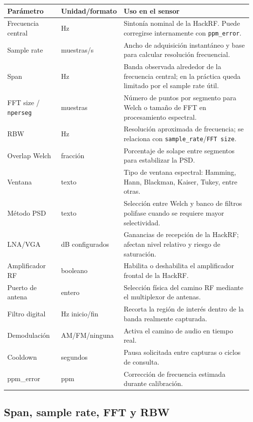 \begin{longtable}{p{}p{}p{}}
\toprule
\textbf{Parámetro} & \textbf{Unidad/formato} & \textbf{Uso en el sensor} \\
\midrule
\endhead
Frecuencia central & Hz & Sintonía nominal de la HackRF. Puede corregirse internamente con \texttt{ppm\_error}. \\
Sample rate & muestras/s & Ancho de adquisición instantáneo y base para calcular resolución frecuencial. \\
Span & Hz & Banda observada alrededor de la frecuencia central; en la práctica queda limitado por el sample rate útil. \\
FFT size / \texttt{nperseg} & muestras & Número de puntos por segmento para Welch o tamaño de FFT en procesamiento espectral. \\
RBW & Hz & Resolución aproximada de frecuencia; se relaciona con \texttt{sample\_rate}/\texttt{FFT size}. \\
Overlap Welch & fracción & Porcentaje de solape entre segmentos para estabilizar la PSD. \\
Ventana & texto & Tipo de ventana espectral: Hamming, Hann, Blackman, Kaiser, Tukey, entre otras. \\
Método PSD & texto & Selección entre Welch y banco de filtros polifase cuando se requiere mayor selectividad. \\
LNA/VGA & dB configurados & Ganancias de recepción de la HackRF; afectan nivel relativo y riesgo de saturación. \\
Amplificador RF & booleano & Habilita o deshabilita el amplificador frontal de la HackRF. \\
Puerto de antena & entero & Selección física del camino RF mediante el multiplexor de antenas. \\
Filtro digital & Hz inicio/fin & Recorta la región de interés dentro de la banda realmente capturada. \\
Demodulación & AM/FM/ninguna & Activa el camino de audio en tiempo real. \\
Cooldown & segundos & Pausa solicitada entre capturas o ciclos de consulta. \\
ppm\_error & ppm & Corrección de frecuencia estimada durante calibración. \\
\bottomrule
\end{longtable}

\subsection{Span, sample rate, FFT y RBW}

